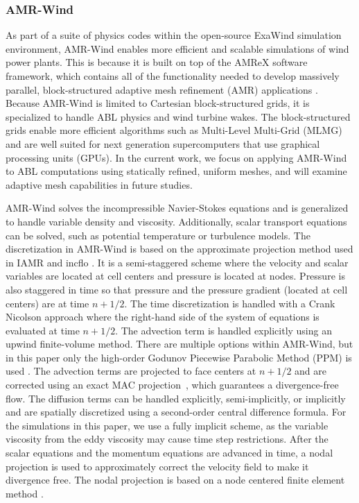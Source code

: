 \subsubsection{AMR-Wind}

As part of a suite of physics codes within the open-source ExaWind simulation environment,
AMR-Wind enables more efficient and scalable simulations of wind power plants.
This is because it is built on top of the AMReX software framework, which
contains all of the functionality needed to develop massively parallel,
block-structured adaptive mesh refinement (AMR) applications \cite{AMReX_JOSS}.
Because AMR-Wind is limited to Cartesian block-structured grids, it is
specialized to handle ABL physics and wind turbine wakes.  The block-structured
grids enable more efficient algorithms such as Multi-Level Multi-Grid (MLMG)
\cite{AMReX_JOSS} and are well suited for next generation supercomputers that
use graphical processing units (GPUs).  In the current work, we focus on
applying AMR-Wind to ABL computations using statically refined, uniform meshes,
and will examine adaptive mesh capabilities in future studies.

AMR-Wind solves the incompressible Navier-Stokes equations and is generalized to
handle variable density and viscosity. Additionally, scalar transport equations
can be solved, such as potential temperature or turbulence models. The
discretization in AMR-Wind is based on the approximate projection method used in
IAMR \cite{almgren1998conservative} and incflo \cite{sverdrup2018highly}. It is
a semi-staggered scheme where the velocity and scalar variables are located at
cell centers and pressure is located at nodes. Pressure is also staggered in
time so that pressure and the pressure gradient (located at cell centers) are at
time $n+1/2$.  The time discretization is handled with a Crank Nicolson
approach where the right-hand side of the system of equations is evaluated at
time $n+1/2$. The advection term is handled explicitly using an upwind
finite-volume method. There are multiple options within AMR-Wind, but in this
paper only the high-order Godunov Piecewise Parabolic Method (PPM) is used
\cite{Colella1984}. The advection terms are projected to face centers at $n+1/2$
and are corrected using an exact MAC projection~\cite{almgren1998conservative},
which guarantees a divergence-free flow. The diffusion terms can be handled
explicitly, semi-implicitly, or implicitly and are spatially discretized using a
second-order central difference formula.  For the simulations in this paper, we
use a fully implicit scheme, as the variable viscosity from the eddy viscosity
may cause time step restrictions. After the scalar equations and the momentum
equations are advanced in time, a nodal projection is used to approximately
correct the velocity field to make it divergence free.  The nodal projection is
based on a node centered finite element method \cite{almgren1998conservative}.

